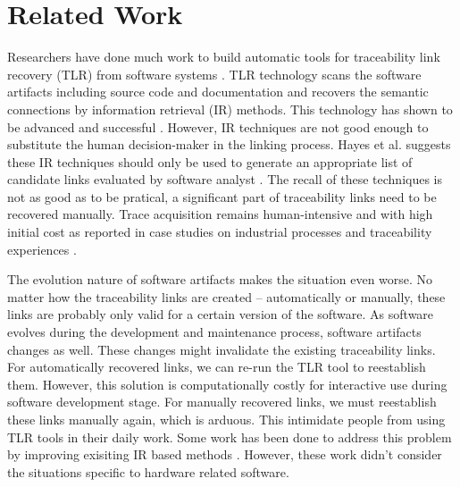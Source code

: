 \section{Related Work}
\label{sec:related}
Researchers have done much work to build automatic tools for traceability link recovery (TLR) from software systems \cite{antoniol_recoveringtraceability_2002} \cite{deLucia_incremental_2006} \cite{marcus_recovering_2003}.
TLR technology scans the software artifacts including source code and documentation and recovers the semantic connections by information retrieval (IR) methods.
This technology has shown to be advanced and successful \cite{spanoudakis_software_2004}.
However, IR techniques are not good enough to substitute the human decision-maker in the linking process.
Hayes et al. suggests these IR techniques should only be used to generate an appropriate list of candidate links evaluated by software analyst \cite{hayes_advancing_2006}.
The recall of these techniques is not as good as to be pratical, a significant part of traceability links need to be recovered manually.
Trace acquisition remains human-intensive and with high initial cost as reported in case studies on industrial processes and traceability experiences \cite{lindvall_practical_1996} \cite{ramesh_implementing_1995} \cite{asuncion_an_2007} \cite{gotel_extended_1997} \cite{neumuller_case_2006}.

The evolution nature of software artifacts makes the situation even worse.
No matter how the traceability links are created -- automatically or manually,
these links are probably only valid for a certain version of the software.
As software evolves during the development and maintenance process, software artifacts changes as well.
These changes might invalidate the existing traceability links.
For automatically recovered links, we can re-run the TLR tool to reestablish them.
However, this solution is computationally costly for interactive use during software development stage.
For manually recovered links, we must reestablish these links manually again, which is arduous.
This intimidate people from using TLR tools in their daily work.
Some work has been done to address this problem by improving exisiting IR based methods \cite{jiang_incremental_2008}.
However, these work didn't consider the situations specific to hardware related software.


